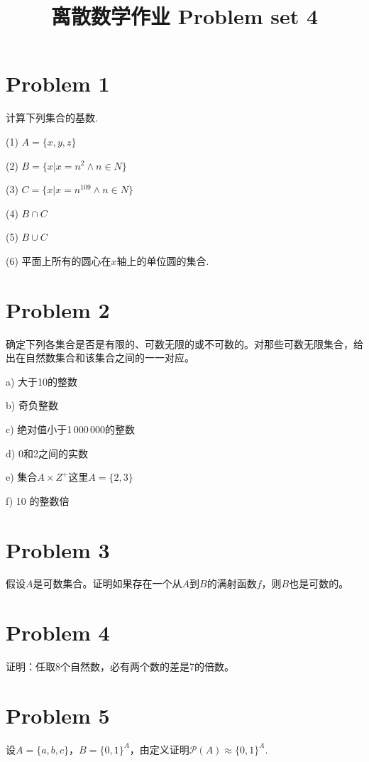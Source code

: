 \documentclass[a4paper]{article}
\begin{document}
\begin{CJK*}{GBK}{song}
\title{\textbf{\fontsize{20pt}{\baselineskip}\selectfont 离散数学作业 Problem set 4}}
\date{}\maketitle
\section*{Problem 1}
计算下列集合的基数.
\begin{description}
\item (1) $A=\{x,y,z\} $
\item (2) $B=\{x|x=n^2\wedge n\in N\}$
\item (3) $C=\{x|x=n^{109}\wedge n\in N\}$
\item (4) $B\cap C$
\item (5) $B\cup C$
\item (6) 平面上所有的圆心在$x$轴上的单位圆的集合.
\end{description}

\section*{Problem 2}
确定下列各集合是否是有限的、可数无限的或不可数的。对那些可数无限集合，给出在自然数集合和该集合之间的一一对应。

\begin{description}
\item a) 大于10的整数
\item b) 奇负整数
\item c) 绝对值小于1\,000\,000的整数
\item d) 0和2之间的实数
\item e) 集合$A\times Z^+$这里$A=\{2,3\}$
\item f) 10 的整数倍
\end{description}

\section*{Problem 3}
假设$A$是可数集合。证明如果存在一个从$A$到$B$的满射函数$f$，则$B$也是可数的。

\section*{Problem 4}
证明：任取8个自然数，必有两个数的差是7的倍数。

\section*{Problem 5}
设$A=\{a,b,c\}$，$B=\{0,1\}^A$，由定义证明$\mathcal P(A)\approx \{0,1\}^A$.


\end{CJK*}
\end{document}
